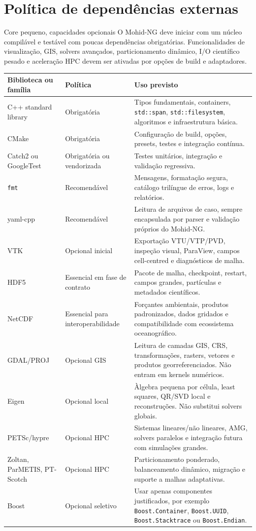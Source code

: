 \documentclass[11pt,a4paper]{article}
\begin{document}
\section{Pol\'itica de depend\^encias externas}

\begin{decisionbox}{Core pequeno, capacidades opcionais}
O Mohid-NG deve iniciar com um n\'ucleo compil\'avel e test\'avel com poucas depend\^encias obrigat\'orias. Funcionalidades de visualiza\c{c}\~ao, GIS, solvers avan\c{c}ados, particionamento din\^amico, I/O cient\'ifico pesado e acelera\c{c}\~ao HPC devem ser ativadas por op\c{c}\~oes de build e adaptadores.
\end{decisionbox}

\begin{longtable}{p{}p{}p{}}
\toprule
\textbf{Biblioteca ou fam\'ilia} & \textbf{Pol\'itica} & \textbf{Uso previsto}\tabularnewline
\midrule
C++ standard library & Obrigat\'oria & Tipos fundamentais, containers, \texttt{std::span}, \texttt{std::filesystem}, algoritmos e infraestrutura b\'asica.\tabularnewline
\addlinespace
CMake & Obrigat\'oria & Configura\c{c}\~ao de build, op\c{c}\~oes, presets, testes e integra\c{c}\~ao cont\'inua.\tabularnewline
\addlinespace
Catch2 ou GoogleTest & Obrigat\'oria ou vendorizada & Testes unit\'arios, integra\c{c}\~ao e valida\c{c}\~ao regressiva.\tabularnewline
\addlinespace
\texttt{fmt} & Recomend\'avel & Mensagens, formata\c{c}\~ao segura, cat\'alogo tril\'ingue de erros, logs e relat\'orios.\tabularnewline
\addlinespace
yaml-cpp & Recomend\'avel & Leitura de arquivos de caso, sempre encapsulada por parser e valida\c{c}\~ao pr\'oprios do Mohid-NG.\tabularnewline
\addlinespace
VTK & Opcional inicial & Exporta\c{c}\~ao VTU/VTP/PVD, inspe\c{c}\~ao visual, ParaView, campos cell-centred e diagn\'osticos de malha.\tabularnewline
\addlinespace
HDF5 & Essencial em fase de contrato & Pacote de malha, checkpoint, restart, campos grandes, part\'iculas e metadados cient\'ificos.\tabularnewline
\addlinespace
NetCDF & Essencial para interoperabilidade & For\c{c}antes ambientais, produtos padronizados, dados gridados e compatibilidade com ecossistema oceanogr\'afico.\tabularnewline
\addlinespace
GDAL/PROJ & Opcional GIS & Leitura de camadas GIS, CRS, transforma\c{c}\~oes, rasters, vetores e produtos georreferenciados. N\~ao entram em kernels num\'ericos.\tabularnewline
\addlinespace
Eigen & Opcional local & \`Algebra pequena por c\'elula, least squares, QR/SVD local e reconstru\c{c}\~oes. N\~ao substitui solvers globais.\tabularnewline
\addlinespace
PETSc/hypre & Opcional HPC & Sistemas lineares/n\~ao lineares, AMG, solvers paralelos e integra\c{c}\~ao futura com simula\c{c}\~oes grandes.\tabularnewline
\addlinespace
Zoltan, ParMETIS, PT-Scotch & Opcional HPC & Particionamento ponderado, balanceamento din\^amico, migra\c{c}\~ao e suporte a malhas adaptativas.\tabularnewline
\addlinespace
Boost & Opcional seletivo & Usar apenas componentes justificados, por exemplo \texttt{Boost.Container}, \texttt{Boost.UUID}, \texttt{Boost.Stacktrace} ou \texttt{Boost.Endian}.\tabularnewline
\bottomrule
\end{longtable}
\end{document}
